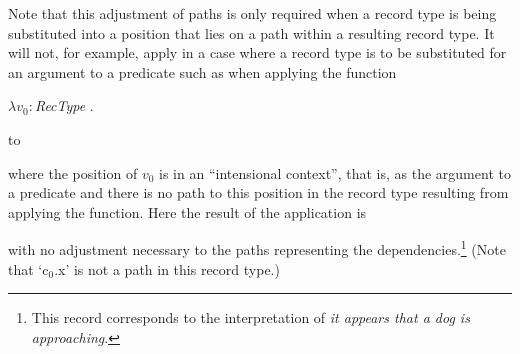 Note
that this adjustment of paths is only required when a record type is being
substituted into a position that lies on a path within a resulting
record type.  It will not, for example, apply in a case where a record
type is to be substituted for an argument to a predicate such as when
applying the function
\begin{display}
$\lambda v_0:$\textit{RecType} . 
\end{display}
to
\begin{display}
\end{display}
where the position of $v_0$ is in an ``intensional context'', that is,
as the argument to a predicate and there is no path to this position
in the record type resulting from applying the function.  Here the
result of the application is
\begin{display}
\end{display}
with no adjustment necessary to the paths representing the
dependencies.\footnote{This record corresponds to the interpretation
  of \textit{it appears that a dog is approaching}.}  (Note that `c$_0$.x' is not a path in this record
type.) 

